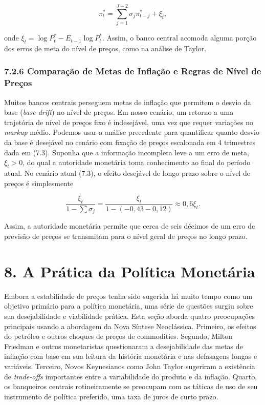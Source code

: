 \documentclass[12pt]{article}
\begin{document}
\begin{equation}
\pi_t^* = \sum_{j=1}^{J-2} \sigma_j \pi_{t-j}^* + \xi_t, \tag{7.4}
\end{equation}

onde $\xi_t = \log P_t^* - E_{t-1} \log P_t^*$. Assim, o banco central acomoda alguma porção dos erros de meta do nível de preços, como na análise de Taylor.

\subsubsection{7.2.6 Comparação de Metas de Inflação e Regras de Nível de Preços} Muitos bancos centrais perseguem metas de inflação que permitem o desvio da base (\textit{base drift}) no nível de preços. Em nosso cenário, um retorno a uma trajetória de nível de preços fixo é indesejável, uma vez que requer variações no \textit{markup} médio. Podemos usar a análise precedente para quantificar quanto desvio da base é desejável no cenário com fixação de preços escalonada em 4 trimestres dada em (7.3). Suponha que a informação incompleta leve a um erro de meta, $\xi_t > 0$, do qual a autoridade monetária toma conhecimento ao final do período atual. No cenário atual (7.3), o efeito desejável de longo prazo sobre o nível de preços é simplesmente

\begin{equation}
\frac{\xi_t}{1 - \sum \sigma_j} = \frac{\xi_t}{1 - (-0,43 - 0,12)} \approx 0,6 \xi_t.
\end{equation}

Assim, a autoridade monetária permite que cerca de seis décimos de um erro de previsão de preços se transmitam para o nível geral de preços no longo prazo.

\section{8. A Prática da Política Monetária}

Embora a estabilidade de preços tenha sido sugerida há muito tempo como um objetivo primário para a política monetária, uma série de questões surgiu sobre sua desejabilidade e viabilidade prática. Esta seção aborda quatro preocupações principais usando a abordagem da Nova Síntese Neoclássica. Primeiro, os efeitos do petróleo e outros choques de preços de commodities. Segundo, Milton Friedman e outros monetaristas questionaram a desejabilidade das metas de inflação com base em sua leitura da história monetária e nas defasagens longas e variáveis. Terceiro, Novos Keynesianos como John Taylor sugeriram a existência de \textit{trade-offs} importantes entre a variabilidade do produto e da inflação. Quarto, os banqueiros centrais rotineiramente se preocupam com as táticas de uso de seu instrumento de política preferido, uma taxa de juros de curto prazo.
\end{document}
